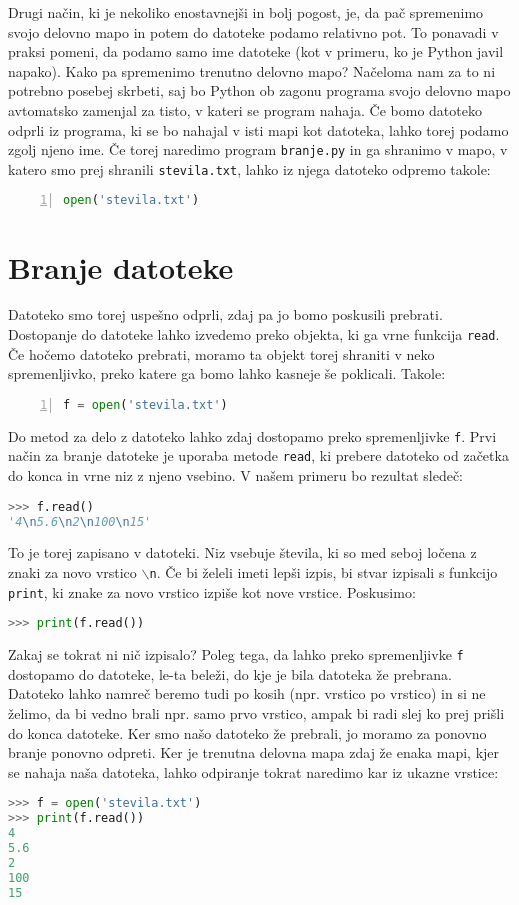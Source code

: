 Drugi način, ki je nekoliko enostavnejši in bolj pogost, je, da pač spremenimo svojo delovno mapo in potem do datoteke podamo relativno pot. To ponavadi v praksi pomeni, da podamo samo ime datoteke (kot v primeru, ko je Python javil napako). Kako pa spremenimo trenutno delovno mapo? Načeloma nam za to ni potrebno posebej skrbeti, saj bo Python ob zagonu programa svojo delovno mapo avtomatsko zamenjal za tisto, v kateri se program nahaja. Če bomo datoteko odprli iz programa, ki se bo nahajal v isti mapi kot datoteka, lahko torej podamo zgolj njeno ime. Če torej naredimo program \texttt{branje.py} in ga shranimo v mapo, v katero smo prej shranili \texttt{stevila.txt}, lahko iz njega datoteko odpremo takole:
\begin{lstlisting}[language=Python, showstringspaces=false, numbers=left]
open('stevila.txt')
\end{lstlisting}

\section{Branje datoteke}
Datoteko smo torej uspešno odprli, zdaj pa jo bomo poskusili prebrati. Dostopanje do datoteke lahko izvedemo preko objekta, ki ga vrne funkcija \texttt{read}. Če hočemo datoteko prebrati, moramo ta objekt torej shraniti v neko spremenljivko, preko katere ga bomo lahko kasneje še poklicali. Takole:
\begin{lstlisting}[language=Python, showstringspaces=false, numbers=left]
f = open('stevila.txt')
\end{lstlisting}
Do metod za delo z datoteko lahko zdaj dostopamo preko spremenljivke \texttt{f}. Prvi način za branje datoteke je uporaba metode \texttt{read}, ki prebere datoteko od začetka do konca in vrne niz z njeno vsebino. V našem primeru bo rezultat sledeč:
\begin{lstlisting}[language=Python, showstringspaces=false]
>>> f.read()
'4\n5.6\n2\n100\n15'
\end{lstlisting}
To je torej zapisano v datoteki. Niz vsebuje števila, ki so med seboj ločena z znaki za novo vrstico \texttt{$\backslash$n}. Če bi želeli imeti lepši izpis, bi stvar izpisali s funkcijo \texttt{print}, ki znake za novo vrstico izpiše kot nove vrstice. Poskusimo:
\begin{lstlisting}[language=Python, showstringspaces=false]
>>> print(f.read())

\end{lstlisting}
Zakaj se tokrat ni nič izpisalo? Poleg tega, da lahko preko spremenljivke \texttt{f} dostopamo do datoteke, le-ta beleži, do kje je bila datoteka že prebrana. Datoteko lahko namreč beremo tudi po kosih (npr. vrstico po vrstico) in si ne želimo, da bi vedno brali npr. samo prvo vrstico, ampak bi radi slej ko prej prišli do konca datoteke. Ker smo našo datoteko že prebrali, jo moramo za ponovno branje ponovno odpreti. Ker je trenutna delovna mapa zdaj že enaka mapi, kjer se nahaja naša datoteka, lahko odpiranje tokrat naredimo kar iz ukazne vrstice:
\begin{lstlisting}[language=Python, showstringspaces=false]
>>> f = open('stevila.txt')
>>> print(f.read())
4
5.6
2
100
15
\end{lstlisting}

